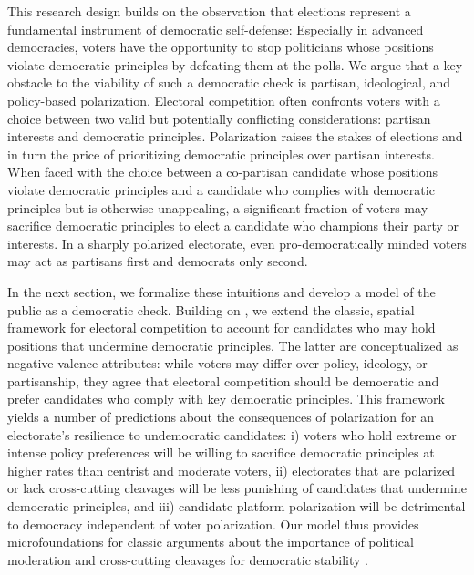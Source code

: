 \documentclass[letterpaper, 12pt]{article}
\begin{document}
\begin{raggedright}
This research design builds on the observation that elections represent a fundamental instrument of democratic self-defense: Especially in advanced democracies, voters have the opportunity to stop politicians whose positions violate democratic principles by defeating them at the polls. We argue that a key obstacle to the viability of such a democratic check is partisan, ideological, and policy-based polarization. Electoral competition often confronts voters with a choice between two valid but potentially conflicting considerations: partisan interests and democratic principles. Polarization raises the stakes of elections and in turn the price of prioritizing democratic principles over partisan interests. When faced with the choice between a co-partisan candidate whose positions violate democratic principles and a candidate who complies with democratic principles but is otherwise unappealing, a significant fraction of voters may sacrifice democratic principles to elect a candidate who champions their party or interests. In a sharply polarized electorate, even pro-democratically minded voters may act as partisans first and democrats only second.

In the next section, we formalize these intuitions and develop a model of the public as a democratic check. Building on \citet{Svolik2019}, we extend the classic, spatial framework for electoral competition to account for candidates who may hold positions that undermine democratic principles. The latter are conceptualized as negative valence attributes: while voters may differ over policy, ideology, or partisanship, they agree that electoral competition should be democratic and prefer candidates who comply with key democratic principles. This framework yields a number of predictions about the consequences of polarization for an electorate's resilience to undemocratic candidates: i) voters who hold extreme or intense policy preferences will be willing to sacrifice democratic principles at higher rates than centrist and moderate voters, ii) electorates that are polarized or lack cross-cutting cleavages will be less punishing of candidates that undermine democratic principles, and iii) candidate platform polarization will be detrimental to democracy independent of voter polarization. Our model thus provides microfoundations for classic arguments about the importance of political moderation and cross-cutting cleavages for democratic stability \citep{Dahl1956,Lipset1960}.


\end{raggedright}
\end{document}
